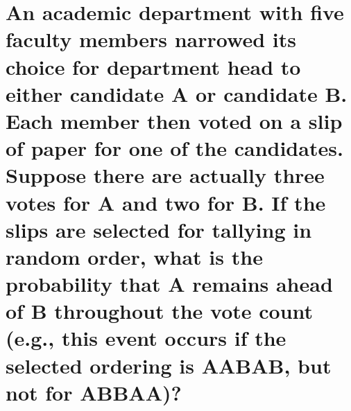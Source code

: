 \newpage
\section{An academic department with five faculty members narrowed its choice for department head to either candidate A or candidate B. Each member then voted on a slip of paper for one of the candidates. Suppose there are actually three votes for A and two for B. If the slips are selected for tallying in random order, what is the probability that A remains ahead of B throughout the vote count (e.g., this event occurs if the selected ordering is AABAB, but not for ABBAA)?}